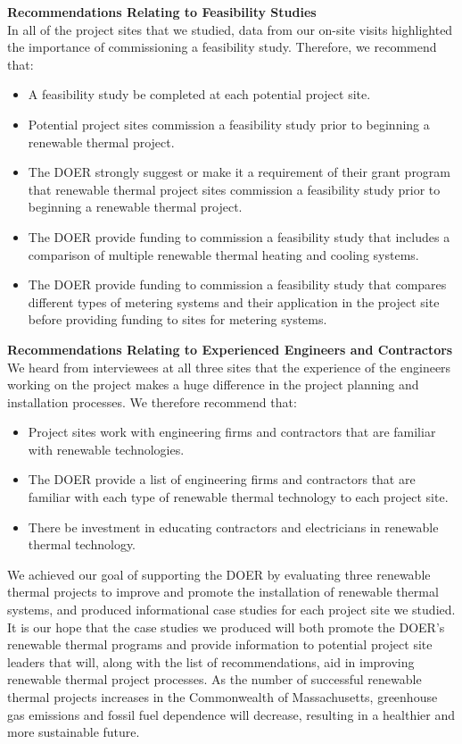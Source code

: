 \noindent
\textbf{Recommendations Relating to Feasibility Studies}\\
\indent In all of the project sites that we studied, data from our on-site visits highlighted the importance of commissioning a feasibility study. Therefore, we recommend that:
\begin{itemize}
  \item{A feasibility study be completed at each potential project site.}
  \item{Potential project sites commission a feasibility study prior to beginning a renewable thermal project.}
  \item{The DOER strongly suggest or make it a requirement of their grant program that renewable thermal project sites commission a feasibility study prior to beginning a renewable thermal project.}
  \item{The DOER provide funding to commission a feasibility study that includes a comparison of multiple renewable thermal heating and cooling systems.}
  \item{The DOER provide funding to commission a feasibility study that compares different types of metering systems and their application in the project site before providing funding to sites for metering systems.}
\end{itemize}

\noindent
\textbf{Recommendations Relating to Experienced Engineers and Contractors}\\
\indent We heard from interviewees at all three sites that the experience of the engineers working on the project makes a huge difference in the project planning and installation processes. We therefore recommend that:
\begin{itemize}
  \item{Project sites work with engineering firms and contractors that are familiar with renewable technologies.}
  \item{The DOER provide a list of engineering firms and contractors that are familiar with each type of renewable thermal technology to each project site.}
  \item{There be investment in educating contractors and electricians in renewable thermal technology.}
\end{itemize}

\par We achieved our goal of supporting the DOER by evaluating three renewable thermal projects to improve and promote the installation of renewable thermal systems, and produced informational case studies for each project site we studied. It is our hope that the case studies we produced will both promote the DOER’s renewable thermal programs and provide information to potential project site leaders that will, along with the list of recommendations, aid in improving renewable thermal project processes. As the number of successful renewable thermal projects increases in the Commonwealth of Massachusetts, greenhouse gas emissions and fossil fuel dependence will decrease, resulting in a healthier and more sustainable future.
